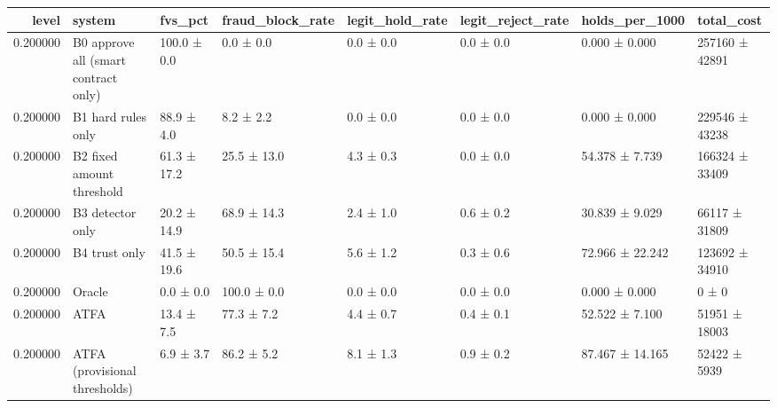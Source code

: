 \begin{tabular}{rlllllll}
\toprule
level & system & fvs\_pct & fraud\_block\_rate & legit\_hold\_rate & legit\_reject\_rate & holds\_per\_1000 & total\_cost \\
\midrule
0.200000 & B0 approve all (smart contract only) & 100.0 ± 0.0 & 0.0 ± 0.0 & 0.0 ± 0.0 & 0.0 ± 0.0 & 0.000 ± 0.000 & 257160 ± 42891 \\
0.200000 & B1 hard rules only & 88.9 ± 4.0 & 8.2 ± 2.2 & 0.0 ± 0.0 & 0.0 ± 0.0 & 0.000 ± 0.000 & 229546 ± 43238 \\
0.200000 & B2 fixed amount threshold & 61.3 ± 17.2 & 25.5 ± 13.0 & 4.3 ± 0.3 & 0.0 ± 0.0 & 54.378 ± 7.739 & 166324 ± 33409 \\
0.200000 & B3 detector only & 20.2 ± 14.9 & 68.9 ± 14.3 & 2.4 ± 1.0 & 0.6 ± 0.2 & 30.839 ± 9.029 & 66117 ± 31809 \\
0.200000 & B4 trust only & 41.5 ± 19.6 & 50.5 ± 15.4 & 5.6 ± 1.2 & 0.3 ± 0.6 & 72.966 ± 22.242 & 123692 ± 34910 \\
0.200000 & Oracle & 0.0 ± 0.0 & 100.0 ± 0.0 & 0.0 ± 0.0 & 0.0 ± 0.0 & 0.000 ± 0.000 & 0 ± 0 \\
0.200000 & ATFA & 13.4 ± 7.5 & 77.3 ± 7.2 & 4.4 ± 0.7 & 0.4 ± 0.1 & 52.522 ± 7.100 & 51951 ± 18003 \\
0.200000 & ATFA (provisional thresholds) & 6.9 ± 3.7 & 86.2 ± 5.2 & 8.1 ± 1.3 & 0.9 ± 0.2 & 87.467 ± 14.165 & 52422 ± 5939 \\
\bottomrule
\end{tabular}
